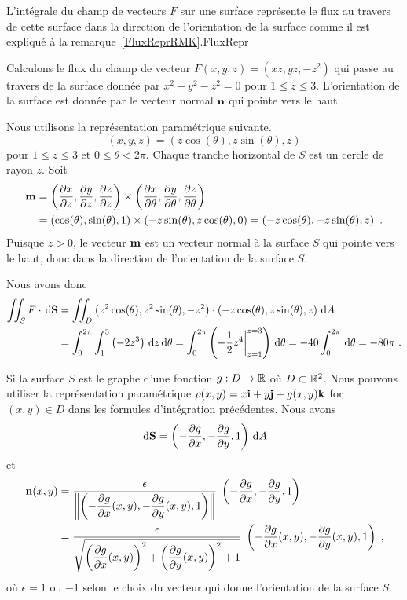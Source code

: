 {
{L'intégrale du champ de vecteurs $F$ sur une surface
représente le flux au travers de cette surface dans la direction de
l'orientation de la surface comme il est expliqué à la
remarque~\ref{FluxReprRMK}.}{FluxRepr}

\begin{egg}
Calculons le flux du champ de vecteur $F(x,y,z) = (xz, yz,-z^2)$
qui passe au travers de la surface donnée par $x^2 + y^2 - z^2 =0$ pour
$1 \leq z \leq 3$.  L'orientation de la surface est donnée par le vecteur
normal $\mathbf{n}$ qui pointe vers le haut.

Nous utilisons la représentation paramétrique suivante.
\[
 (x,y,z) = (z \cos(\theta), z \sin(\theta), z)
\]
pour $1 \leq z \leq 3$ et $0 \leq \theta < 2\pi$.  Chaque tranche
horizontal de $S$ est un cercle de rayon $z$.  Soit
\begin{align*}
\mathbf{m} &= \left( \frac{\partial x}{\partial z} , \frac{\partial y}{\partial z} , \frac{\partial z}{\partial z} \right)
\times \left( \frac{\partial x}{\partial \theta} , \frac{\partial y}{\partial \theta} ,
\frac{\partial z}{\partial \theta} \right) \\
&= \left( \cos(\theta), \sin(\theta), 1 \right)
\times
\left( -z\sin(\theta) , z\cos(\theta) , 0 \right)
= \left( -z\cos(\theta) , -z \sin(\theta) , z\right) \ .
\end{align*}
Puisque $z>0$, le vecteur $\displaystyle \mathbf{m}$
est un vecteur normal à la surface $S$ qui pointe vers le haut, donc
dans la direction de l'orientation de la surface $S$.

Nous avons donc
\begin{align*}
\iint_S F \cdot \,\mathrm{d}\mathbf{S} &=  
\iint_D \left( z^2 \cos(\theta) , z^2\sin(\theta), -z^2\right) \cdot
\left( -z\cos(\theta) , z \sin(\theta) , z\right) \,\mathrm{d}A \\
&= \int_0^{2\pi} \int_1^3 \left( -2z^3\right) \,\mathrm{d}z \,\mathrm{d}\theta
= \int_0^{2\pi} \left( -\frac{1}{2} z^4\bigg|_{z=1}^{z=3}\right) \,\mathrm{d}\theta
= -40 \int_0^{2\pi} \,\mathrm{d}\theta = -80 \pi \ .
\end{align*}
\end{egg}

Si la surface $S$ est le graphe d'une fonction $g:D\rightarrow \mathbb{R}$ où
$D \subset \mathbb{R}^2$.  Nous pouvons utiliser la représentation paramétrique 
$\rho(x,y)= x\mathbf{i} + y\mathbf{j} + g(x,y)\mathbf{k}$ for $(x,y) \in D$ dans les
formules d'intégration précédentes.  Nous avons
\[
\,\mathrm{d}\mathbf{S} = \left(-\frac{\partial g}{\partial x} , -\frac{\partial g}{\partial y}, 1\right) \,\mathrm{d}A
\]
et
\begin{align*}
\mathbf{n}(x,y) &=
\frac{\epsilon}
{\displaystyle \left\| \left(-\frac{\partial g}{\partial x}(x,y) , -\frac{\partial g}{\partial y}(x,y) , 1\right)
\right\|} \; \left(-\frac{\partial g}{\partial x} , -\frac{\partial g}{\partial y}, 1\right) \\
&= \frac{\epsilon}{\displaystyle \sqrt{ \left(\frac{\partial g}{\partial x}(x,y)\right)^2 +
    \left(\frac{\partial g}{\partial y}(x,y)\right)^2 + 1}}\;
\left(-\frac{\partial g}{\partial x}(x,y) , -\frac{\partial g}{\partial y}(x,y), 1\right) \; ,
\end{align*}
où $\epsilon = 1$ ou $-1$ selon le choix du vecteur qui donne
l'orientation de la surface $S$.

}
